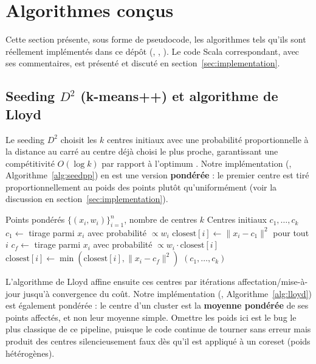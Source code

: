 \section{Algorithmes conçus}
\label{sec:algorithms}

Cette section présente, sous forme de pseudocode, les algorithmes tels
qu'ils sont réellement implémentés dans ce dépôt (,
, ). Le code Scala correspondant,
avec ses commentaires, est présenté et discuté en
section~\ref{sec:implementation}.

\subsection{Seeding $D^2$ (k-means++) et algorithme de Lloyd}

Le seeding $D^2$ choisit les $k$ centres initiaux avec une probabilité
proportionnelle à la distance au carré au centre déjà choisi le plus proche,
garantissant une compétitivité $O(\log k)$ par rapport à l'optimum
\cite{arthur2007}. Notre implémentation (,
Algorithme~\ref{alg:seedpp}) en est une version \textbf{pondérée} : le
premier centre est tiré proportionnellement au poids des points plutôt
qu'uniformément (voir la discussion en section~\ref{sec:implementation}).

\begin{algorithm}[h]
\caption{ : seeding $D^2$ pondéré}
\label{alg:seedpp}
\begin{algorithmic}[1]
\REQUIRE Points pondérés $\{(x_i, w_i)\}_{i=1}^n$, nombre de centres $k$
\ENSURE Centres initiaux $c_1,\dots,c_k$
\STATE $c_1 \leftarrow$ tirage parmi $x_i$ avec probabilité $\propto w_i$
\STATE $\mathrm{closest}[i] \leftarrow \lVert x_i - c_1\rVert^2$ pour tout $i$
  \STATE $c_f \leftarrow$ tirage parmi $x_i$ avec probabilité $\propto w_i \cdot \mathrm{closest}[i]$
    \STATE $\mathrm{closest}[i] \leftarrow \min(\mathrm{closest}[i], \lVert x_i - c_f\rVert^2)$ 
  \ENDFOR
\ENDFOR
\RETURN $(c_1,\dots,c_k)$
\end{algorithmic}
\end{algorithm}

L'algorithme de Lloyd affine ensuite ces centres par itérations
affectation/mise-à-jour jusqu'à convergence du coût. Notre implémentation
(, Algorithme~\ref{alg:lloyd}) est également pondérée : le
centre d'un cluster est la \textbf{moyenne pondérée} de ses points affectés,
et non leur moyenne simple. Omettre les poids ici est le bug le plus
classique de ce pipeline, puisque le code continue de tourner sans erreur
mais produit des centres silencieusement faux dès qu'il est appliqué à un
coreset (poids hétérogènes).

